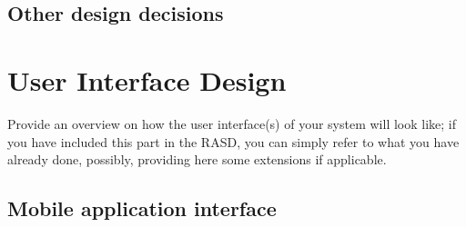 \documentclass{article}
\begin{document}
	\subsection{Other design decisions}
\newpage
\section{User Interface Design}Provide	an	overview	on	how	the	user	interface(s)	of	your	system	will	
look	like; if	you	 have	included	 this	 part	in	 the	 RASD,	you	 can	 simply	 refer	 to	what	you	 have	
already	done,	possibly,	providing	here	some	extensions	if	applicable.
	\FloatBarrier
	\subsection{Mobile application interface}
		\begin{figure}[h]
			\centering
			\begin{subfigure}[h]{0.49\linewidth}

\end{subfigure}
\end{figure}
\end{document}
